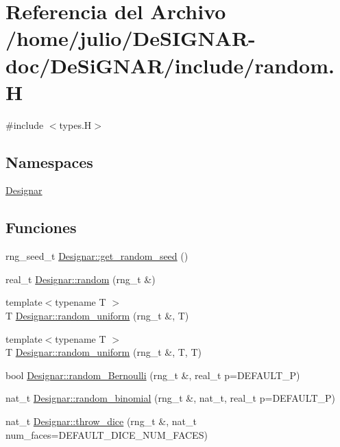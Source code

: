 \hypertarget{random_8_h}{}\section{Referencia del Archivo /home/julio/\+De\+S\+I\+G\+N\+A\+R-\/doc/\+De\+Si\+G\+N\+A\+R/include/random.H}
\label{random_8_h}
{\ttfamily \#include $<$types.\+H$>$}\newline
\subsection*{Namespaces}
\begin{DoxyCompactItemize}
\item 
 \hyperlink{namespace_designar}{Designar}
\end{DoxyCompactItemize}
\subsection*{Funciones}
\begin{DoxyCompactItemize}
\item 
rng\+\_\+seed\+\_\+t \hyperlink{namespace_designar_a39f540907bf568cf8e9983cffbc5246c}{Designar\+::get\+\_\+random\+\_\+seed} ()
\item 
real\+\_\+t \hyperlink{namespace_designar_ae380ee144e16364a26bec38110ac58cc}{Designar\+::random} (rng\+\_\+t \&)
\item 
{\footnotesize template$<$typename T $>$ }\\T \hyperlink{namespace_designar_a1ac1e0ffd178b0439770840ea75144e0}{Designar\+::random\+\_\+uniform} (rng\+\_\+t \&, T)
\item 
{\footnotesize template$<$typename T $>$ }\\T \hyperlink{namespace_designar_a7b0ea319994973073cc92067730c1c1c}{Designar\+::random\+\_\+uniform} (rng\+\_\+t \&, T, T)
\item 
bool \hyperlink{namespace_designar_adf6febbe5fa0abe44ea554203b767685}{Designar\+::random\+\_\+\+Bernoulli} (rng\+\_\+t \&, real\+\_\+t p=D\+E\+F\+A\+U\+L\+T\+\_\+P)
\item 
nat\+\_\+t \hyperlink{namespace_designar_a4f786bd2e0e15f81f468cf60b3a1d9fb}{Designar\+::random\+\_\+binomial} (rng\+\_\+t \&, nat\+\_\+t, real\+\_\+t p=D\+E\+F\+A\+U\+L\+T\+\_\+P)
\item 
nat\+\_\+t \hyperlink{namespace_designar_a29b53c8e7dfb33209e0a79ad167b6803}{Designar\+::throw\+\_\+dice} (rng\+\_\+t \&, nat\+\_\+t num\+\_\+faces=D\+E\+F\+A\+U\+L\+T\+\_\+\+D\+I\+C\+E\+\_\+\+N\+U\+M\+\_\+\+F\+A\+C\+ES)
\end{DoxyCompactItemize}
